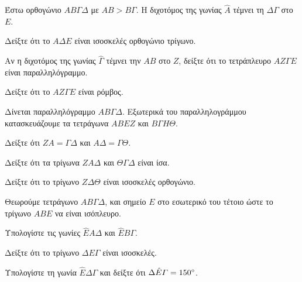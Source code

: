 \documentclass[11pt,a4paper,modern]{FFExercises}
\begin{document}
\askhsh
Έστω ορθογώνιο $ΑΒ\varGamma\Delta$ με $ΑΒ > B\varGamma$. Η διχοτόμος της γωνίας $\hat{A}$ τέμνει τη $\Delta\varGamma$ στο $E$.
\begin{alist}
    \item Δείξτε ότι το $A\Delta E$ είναι ισοσκελές ορθογώνιο τρίγωνο.
    \item Αν η διχοτόμος της γωνίας $\hat{\varGamma}$ τέμνει την $ΑΒ$ στο $Z$, δείξτε ότι το τετράπλευρο $AZ\varGamma E$ είναι παραλληλόγραμμο.
    \item Δείξτε ότι το $AZ\varGamma E$ είναι ρόμβος.
\end{alist}

\askhsh
Δίνεται παραλληλόγραμμο $ΑΒ\varGamma\Delta$. Εξωτερικά του παραλληλογράμμου κατασκευάζουμε τα τετράγωνα $ABEZ$ και $B\varGamma H\Theta$.
\begin{alist}
    \item Δείξτε ότι $ZA = \varGamma\Delta$ και $A\Delta = \varGamma\Theta$.
    \item Δείξτε ότι τα τρίγωνα $ZA\Delta$ και $Θ\varGamma\Delta$ είναι ίσα.
    \item Δείξτε ότι το τρίγωνο $Z\Delta\Theta$ είναι ισοσκελές ορθογώνιο.
\end{alist}

\begin{center}
\end{center}

\askhsh
Θεωρούμε τετράγωνο $ΑΒ\varGamma\Delta$, και σημείο $E$ στο εσωτερικό του τέτοιο ώστε το τρίγωνο $ABE$ να είναι ισόπλευρο.
\begin{alist}
    \item Υπολογίστε τις γωνίες $\hat{E}A\Delta$ και $\hat{E}B\varGamma$.
    \item Δείξτε ότι το τρίγωνο $\Delta E\varGamma$ είναι ισοσκελές.
    \item Υπολογίστε τη γωνία $\hat{E}\Delta\varGamma$ και δείξτε ότι $\Delta\hat{E}\varGamma = 150\degree$.
\end{alist}
\end{document}
